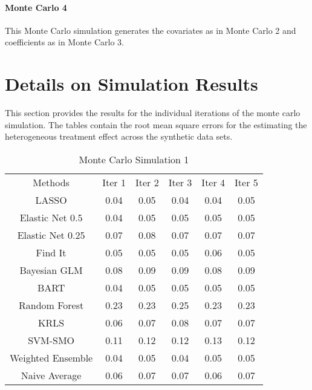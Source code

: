 \documentclass[12pt,letterpaper]{article}
\numberwithin{equation}{section}
\numberwithin{equation}{section}
\begin{document}
\paragraph{Monte Carlo 4} This Monte Carlo simulation generates the covariates as in Monte Carlo 2 and coefficients as in Monte Carlo 3.  



\section{Details on Simulation Results}

This section provides the results for the individual iterations of the monte carlo simulation.  The tables contain the root mean square errors for the estimating the heterogeneous treatment effect across the synthetic data sets.  


\begin{table}[hbt]
\caption{Monte Carlo Simulation 1}
\begin{tabular}{cccccc}
Methods & Iter 1& Iter 2 & Iter 3 & Iter 4 & Iter 5\\
LASSO&0.04&0.05&0.04&0.04&0.05\\ 
Elastic Net 0.5&0.04&0.05&0.05&0.05&0.05\\ 
Elastic Net 0.25&0.07&0.08&0.07&0.07&0.07\\ 
Find It&0.05&0.05&0.05&0.06&0.05\\ 
Bayesian GLM&0.08&0.09&0.09&0.08&0.09\\ 
BART&0.04&0.05&0.05&0.05&0.05\\ 
Random Forest&0.23&0.23&0.25&0.23&0.23\\ 
KRLS&0.06&0.07&0.08&0.07&0.07\\ 
SVM-SMO&0.11&0.12&0.12&0.13&0.12\\ 
Weighted Ensemble&0.04&0.05&0.04&0.05&0.05\\ 
Naive Average&0.06&0.07&0.07&0.06&0.07\\ 
\end{tabular}
\end{table}
\end{document}
